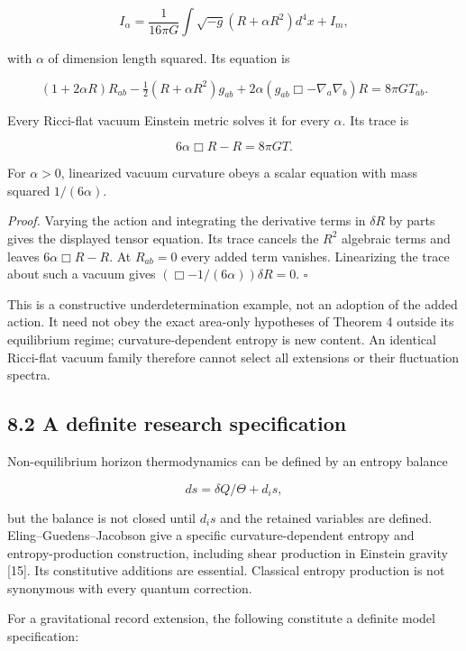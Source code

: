 \documentclass[
  11pt,
  a4paper,
]{article}
\begin{document}
\[
I_\alpha=\frac1{16\pi G}\int\sqrt{-g}(R+\alpha R^2)d^4x+I_m,
\]

with \(\alpha\) of dimension length squared. Its equation is

\[
(1+2\alpha R)R_{ab}-\tfrac12(R+\alpha R^2)g_{ab}
+2\alpha(g_{ab}\Box-\nabla_a\nabla_b)R=8\pi GT_{ab}.
\]

Every Ricci-flat vacuum Einstein metric solves it for every \(\alpha\). Its trace is

\[
6\alpha\Box R-R=8\pi GT.
\]

For \(\alpha>0\), linearized vacuum curvature obeys a scalar equation with mass squared \(1/(6\alpha)\).

\emph{Proof.} Varying the action and integrating the derivative terms in \(\delta R\) by parts gives the displayed tensor equation. Its trace cancels the \(R^2\) algebraic terms and leaves \(6\alpha\Box R-R\). At \(R_{ab}=0\) every added term vanishes. Linearizing the trace about such a vacuum gives \((\Box-1/(6\alpha))\delta R=0\). \(\square\)

This is a constructive underdetermination example, not an adoption of the added action. It need not obey the exact area-only hypotheses of Theorem 4 outside its equilibrium regime; curvature-dependent entropy is new content. An identical Ricci-flat vacuum family therefore cannot select all extensions or their fluctuation spectra.

\subsection{8.2 A definite research specification}\label{a-definite-research-specification}

Non-equilibrium horizon thermodynamics can be defined by an entropy balance

\[
ds=\delta Q/\Theta+d_is,
\]

but the balance is not closed until \(d_is\) and the retained variables are defined. Eling--Guedens--Jacobson give a specific curvature-dependent entropy and entropy-production construction, including shear production in Einstein gravity {[}15{]}. Its constitutive additions are essential. Classical entropy production is not synonymous with every quantum correction.

For a gravitational record extension, the following constitute a definite model specification:
\end{document}
